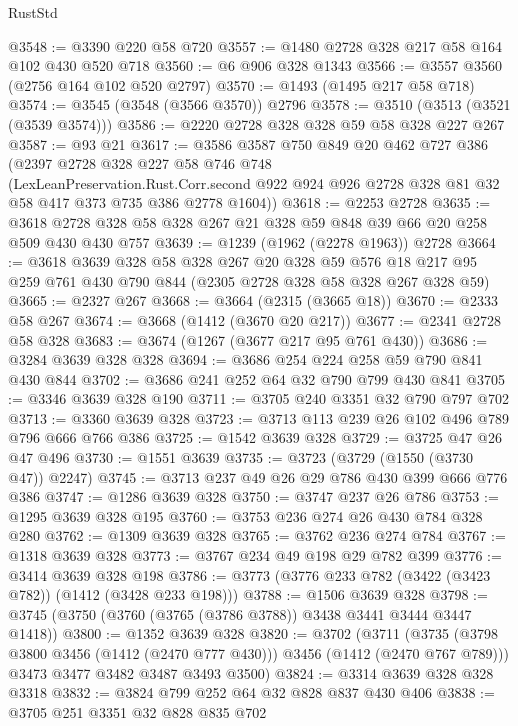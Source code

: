 \begin{lexlean}{RustStd}
\begin{coremodule}
{\begin{coremodule}
{{{{{{{{{{@3548 := @3390 @220 @58 @720
@3557 := @1480 @2728 @328 @217 @58 @164 @102 @430 @520 @718
@3560 := @6 @906 @328 @1343
@3566 := @3557 @3560 (@2756 @164 @102 @520 @2797)
@3570 := @1493 (@1495 @217 @58 @718)
@3574 := @3545 (@3548 (@3566 @3570)) @2796
@3578 := @3510 (@3513 (@3521 (@3539 @3574)))
@3586 := @2220 @2728 @328 @328 @59 @58 @328 @227 @267
@3587 := @93 @21
@3617 := @3586
    @3587
    @750
    @849
    @20
    @462
    @727
    @386
    (@2397
      @2728
      @328
      @227
      @58
      @746
      @748
      (LexLeanPreservation.Rust.Corr.second
        @922
        @924
        @926
        @2728
        @328
        @81
        @32
        @58
        @417
        @373
        @735
        @386
        @2778
        @1604))
@3618 := @2253 @2728
@3635 := @3618 @2728 @328 @58 @328 @267 @21 @328 @59 @848 @39 @66 @20 @258 @509 @430 @430 @757
@3639 := @1239 (@1962 (@2278 @1963)) @2728
@3664 := @3618
    @3639
    @328
    @58
    @328
    @267
    @20
    @328
    @59
    @576
    @18
    @217
    @95
    @259
    @761
    @430
    @790
    @844
    (@2305 @2728 @328 @58 @328 @267 @328 @59)
@3665 := @2327 @267
@3668 := @3664 (@2315 (@3665 @18))
@3670 := @2333 @58 @267
@3674 := @3668 (@1412 (@3670 @20 @217))
@3677 := @2341 @2728 @58 @328
@3683 := @3674 (@1267 (@3677 @217 @95 @761 @430))
@3686 := @3284 @3639 @328 @328
@3694 := @3686 @254 @224 @258 @59 @790 @841 @430 @844
@3702 := @3686 @241 @252 @64 @32 @790 @799 @430 @841
@3705 := @3346 @3639 @328 @190
@3711 := @3705 @240 @3351 @32 @790 @797 @702
@3713 := @3360 @3639 @328
@3723 := @3713 @113 @239 @26 @102 @496 @789 @796 @666 @766 @386
@3725 := @1542 @3639 @328
@3729 := @3725 @47 @26 @47 @496
@3730 := @1551 @3639
@3735 := @3723 (@3729 (@1550 (@3730 @47)) @2247)
@3745 := @3713 @237 @49 @26 @29 @786 @430 @399 @666 @776 @386
@3747 := @1286 @3639 @328
@3750 := @3747 @237 @26 @786
@3753 := @1295 @3639 @328 @195
@3760 := @3753 @236 @274 @26 @430 @784 @328 @280
@3762 := @1309 @3639 @328
@3765 := @3762 @236 @274 @784
@3767 := @1318 @3639 @328
@3773 := @3767 @234 @49 @198 @29 @782 @399
@3776 := @3414 @3639 @328 @198
@3786 := @3773 (@3776 @233 @782 (@3422 (@3423 @782)) (@1412 (@3428 @233 @198)))
@3788 := @1506 @3639 @328
@3798 := @3745 (@3750 (@3760 (@3765 (@3786 @3788)) @3438 @3441 @3444 @3447 @1418))
@3800 := @1352 @3639 @328
@3820 := @3702
    (@3711
      (@3735 (@3798 @3800 @3456 (@1412 (@2470 @777 @430))) @3456 (@1412 (@2470 @767 @789)))
      @3473
      @3477
      @3482
      @3487
      @3493
      @3500)
@3824 := @3314 @3639 @328 @328 @3318
@3832 := @3824 @799 @252 @64 @32 @828 @837 @430 @406
@3838 := @3705 @251 @3351 @32 @828 @835 @702
}}}}}}}}}}
\end{coremodule}}
\end{coremodule}
\end{lexlean}
